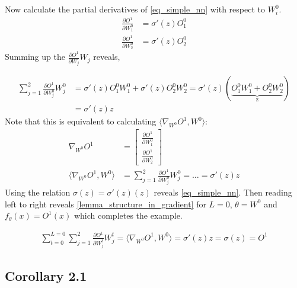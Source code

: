 \documentclass[a4paper]{article}
\begin{document}
Now calculate the partial derivatives of \eqref{eq_simple_nn} with respect to $W^0_i$.
\begin{align*}
	\frac{\partial O^1}{\partial W^0_1} &= \sigma'(z) O^0_1 \\
	\frac{\partial O^1}{\partial W^0_2} &= \sigma'(z) O^0_2
\end{align*}
Summing up the $\frac{\partial O^1}{\partial W_j} W_j$ reveals,

\begin{align*}
	\sum_{j=1}^{2} \frac{\partial O^1}{\partial W^0_j} W^0_j &= \sigma'(z) O^0_1  W^0_1 + \sigma'(z) O^0_2  W^0_2 = \sigma'(z)(\underbrace{O^0_1 W^0_1 + O^0_2 W^0_2}_\text{z}) \\
														&= \sigma'(z) z
\end{align*}
Note that this is equivalent to calculating $\langle \nabla_{W^0} O^1, W^0 \rangle$:
\begin{align*}
	\nabla_{W^0} O^1 &= 
		\begin{bmatrix}
			\frac{\partial O^1}{\partial W^0_1} \\ 
			\frac{\partial O^1}{\partial W^0_2}
		\end{bmatrix} \\
	\langle \nabla_{W^0} O^1, W^0 \rangle &= \sum_{j=1}^{2} \frac{\partial O^1}{\partial W^0_j} W^0_j = \dots = \sigma'(z) z
\end{align*}
Using the relation $\sigma(z) = \sigma'(z)(z)$ reveals \eqref{eq_simple_nn}. Then reading left to right reveals \eqref{lemma_structure_in_gradient} for $L=0$, $\theta= W^0$ and $f_\theta(x) = O^1(x)$ which completes the example.

\begin{align*}
		\sum_{t=0}^{L=0} \sum_{j=1}^{2} \frac{\partial O^1}{\partial W^t_j} W^t_j
		=  \langle \nabla_{W^0} O^1, W^0 \rangle
		= \sigma'(z) z 
		= \sigma(z) = O^1
\end{align*}



\subsection{Corollary 2.1}
\end{document}
